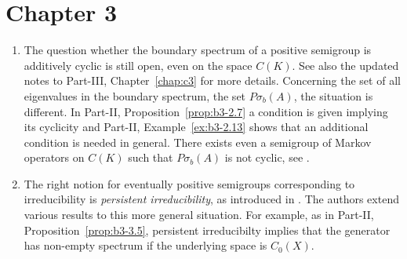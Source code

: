 \section*{Chapter 3}
\begin{enumerate}

\item
The question whether the boundary spectrum of a positive semigroup is additively cyclic is still open, even on the space $C(K)$. 
See also the updated notes to Part-III, Chapter~\ref{chap:c3} for more details.
Concerning the set of all eigenvalues in the boundary spectrum, \ie the set $P\sigma_{b}(A)$, the situation is different. 
In Part-II, Proposition~\ref{prop:b3-2.7} a condition is given implying its cyclicity and Part-II, Example~\ref{ex:b3-2.13} shows that an additional condition is needed in general. 
There exists even a semigroup of Markov operators on  $C(K)$ such that $P\sigma_{b}(A)$ is not cyclic, see \textcite{zbmath06591946}. 

\item 
The right notion for eventually positive semigroups corresponding to irreducibility is \emph{persistent irreducibility}, as introduced in \textcite{zbmath07889246}. 
The authors extend various results to this more general situation. 
For example, as in Part-II, Proposition~\ref{prop:b3-3.5},  persistent irreducibilty implies that the generator has non-empty spectrum if the underlying space is $C_0(X)$. 

\end{enumerate}
